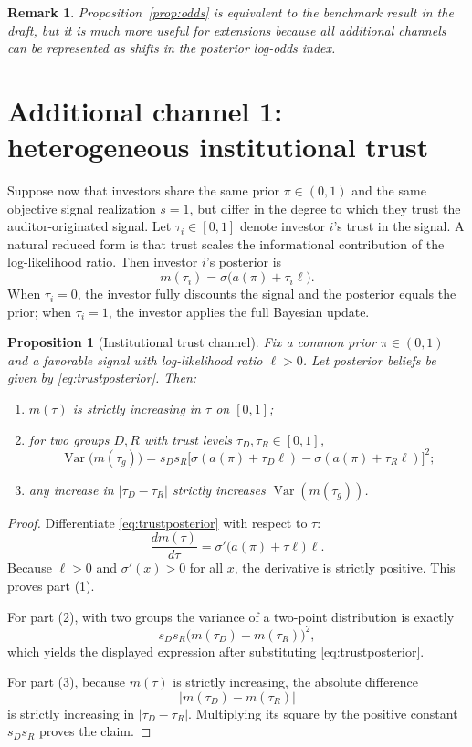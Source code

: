 \documentclass[12pt]{article}
\newtheorem{proposition}{Proposition}
\newtheorem{remark}{Remark}
\begin{document}
\begin{remark}
Proposition~\ref{prop:odds} is equivalent to the benchmark result in the draft, but it is much more useful for extensions because all additional channels can be represented as shifts in the posterior log-odds index.
\end{remark}

\section{Additional channel 1: heterogeneous institutional trust}

Suppose now that investors share the same prior $\pi\in(0,1)$ and the same objective signal realization $s=1$, but differ in the degree to which they trust the auditor-originated signal. Let $\tau_i\in[0,1]$ denote investor $i$'s trust in the signal. A natural reduced form is that trust scales the informational contribution of the log-likelihood ratio. Then investor $i$'s posterior is
\begin{equation}\label{eq:trustposterior}
    m(\tau_i)=\sigma\!\big(a(\pi)+\tau_i\ell\big).
\end{equation}
When $\tau_i=0$, the investor fully discounts the signal and the posterior equals the prior; when $\tau_i=1$, the investor applies the full Bayesian update.

\begin{proposition}[Institutional trust channel]\label{prop:trust}
Fix a common prior $\pi\in(0,1)$ and a favorable signal with log-likelihood ratio $\ell>0$. Let posterior beliefs be given by \eqref{eq:trustposterior}. Then:
\begin{enumerate}
    \item $m(\tau)$ is strictly increasing in $\tau$ on $[0,1]$;
    \item for two groups $D,R$ with trust levels $\tau_D,\tau_R\in[0,1]$,
    \[
        \operatorname{Var}\big(m(\tau_g)\big)=s_Ds_R\big[\sigma(a(\pi)+\tau_D\ell)-\sigma(a(\pi)+\tau_R\ell)\big]^2;
    \]
    \item any increase in $|\tau_D-\tau_R|$ strictly increases \(\operatorname{Var}(m(\tau_g))\).
\end{enumerate}
\end{proposition}

\begin{proof}
Differentiate \eqref{eq:trustposterior} with respect to $\tau$:
\[
    \frac{dm(\tau)}{d\tau}=\sigma'\!\big(a(\pi)+\tau\ell\big)\,\ell.
\]
Because $\ell>0$ and $\sigma'(x)>0$ for all $x$, the derivative is strictly positive. This proves part (1).

For part (2), with two groups the variance of a two-point distribution is exactly
\[
    s_Ds_R\big(m(\tau_D)-m(\tau_R)\big)^2,
\]
which yields the displayed expression after substituting \eqref{eq:trustposterior}.

For part (3), because $m(\tau)$ is strictly increasing, the absolute difference
\[
    |m(\tau_D)-m(\tau_R)|
\]
is strictly increasing in $|\tau_D-\tau_R|$. Multiplying its square by the positive constant $s_Ds_R$ proves the claim.
\end{proof}
\end{document}
